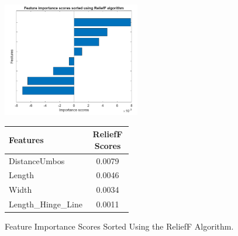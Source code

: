 \begin{figure}[!htbp]
	\centering
	\begin{minipage}{0.48\textwidth} 
		\centering
		\includegraphics[width=\textwidth, height=5cm]{figures/reliefF.png} 
	\end{minipage}%
	\hfill 
	\begin{minipage}{0.48\textwidth} 
		\centering
		{\fontsize{12}{15}\selectfont 
			\begin{tabular}{p{0.5\linewidth}c}
				\hline
				\textbf{Features} & \textbf{ReliefF Scores}   \\ \hline
				DistanceUmbos       & 0.0079   \\
				Length              & 0.0046  \\
				Width               & 0.0034  \\
				Length\_Hinge\_Line & 0.0011  \\
				\hline
			\end{tabular}
		}
	\end{minipage}
	\caption{Feature Importance Scores Sorted Using the ReliefF Algorithm.}
	\label{fig:reliefF-combined}
\end{figure}

